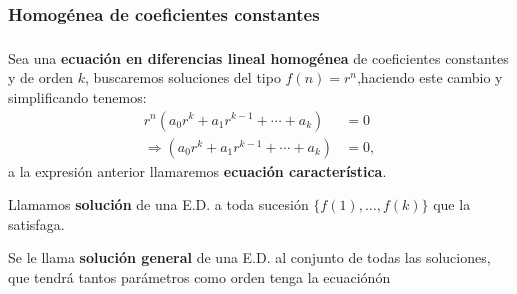 \subsubsection{Homogénea de coeficientes constantes}
\begin{frame}
\frametitle{\subsecname}

\begin{definition}
	Sea una \textbf{ecuación en diferencias lineal homogénea} de coeficientes constantes y de orden $k$, buscaremos soluciones del tipo $f(n)=r^{n}$,haciendo este cambio y simplificando tenemos:
	\begin{align*}
	r^{n}(a_{0}r^{k}+a_{1}r^{k-1}+\cdots+a_{k})&=0\\
	\Rightarrow (a_{0}r^{k}+a_{1}r^{k-1}+\cdots+a_{k})&=0,
	\end{align*}
	a la expresión anterior llamaremos \textbf{ecuación característica}.
\end{definition}

\begin{definition}
	Llamamos \textbf{solución} de una E.D. a toda sucesión $\{ f(1), \ldots, f(k) \}$ que la satisfaga.
\end{definition}

\begin{definition}
	Se le llama \textbf{solución general} de una E.D. al conjunto de todas las soluciones, que tendrá tantos parámetros como orden tenga la ecuaciónón
\end{definition}
\end{frame}

